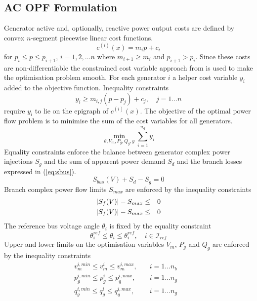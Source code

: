 \subsection{AC OPF Formulation}
Generator active and, optionally, reactive power output costs are defined by
convex $n$-segment piecewise linear cost functions.
\begin{equation}
c^{(i)}(x) = m_ip + c_i
\end{equation}
for $p_i \leq p \leq p_{i+1}$, $i = 1,2,\dotsc n$ where $m_{i+1} \geq m_i$ and
$p_{i+1} > p_i$.  Since these costs are non-differentiable the constrained
cost variable approach from \cite{zimmerman:ccv} is used to make the
optimisation problem smooth.  For each generator $i$ a helper cost variable
$y_i$ added to the objective function.  Inequality constraints
\begin{equation}
y_i \geq m_{i,j}(p-p_j) + c_j, \quad j = 1\dotsc n
\end{equation}
require $y_i$ to lie on the epigraph of $c^{(i)}(x)$.  The objective of the
optimal power flow problem is to minimise the sum of the cost variables for all
generators.
\begin{equation}
\min_{\theta, V_m, P_g, Q_g, y} \sum_{i=1}^{n_g}y_i
\end{equation}
Equality constraints enforce the balance between generator complex power
injections $S_g$ and the sum of apparent power demand $S_d$ and the branch
losses expressed in (\ref{eq:sbus}).
\begin{equation}
S_{bus}(V) + S_d - S_g = 0
\end{equation}
Branch complex power flow limits $S_{max}$ are enforced by the inequality
constraints
\begin{eqnarray}
\lvert S_f(V)\rvert - S_{max}& \leq &0\\
\lvert S_f(V)\rvert - S_{max}& \leq &0
\end{eqnarray}
The reference bus voltage angle $\theta_i$ is fixed by the equality
constraint
\begin{equation}
\label{eq:refbusang}
\theta_i^{ref} \leq \theta_i \leq \theta_i^{ref}, \quad i \in \mathcal{I}_{ref}
\end{equation}
Upper and lower limits on the optimisation variables $V_m$, $P_g$ and $Q_g$ are
enforced by the inequality constraints
\begin{eqnarray}
v_m^{i,min} \leq v_m^i \leq v_m^{i,max},& \quad i= 1 \dotsc n_b&\\
\label{eq:pglim}
p_g^{i,min} \leq p_g^i \leq p_q^{i,max},& \quad i= 1 \dotsc n_g&\\
q_g^{i,min} \leq q_g^i \leq q_q^{i,max},& \quad i= 1 \dotsc n_g&
\end{eqnarray}

